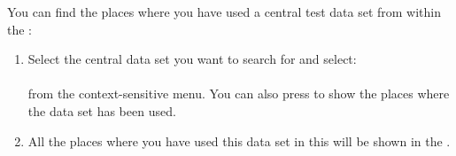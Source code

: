 You can find the places where you have used a central test data set from within the \gddataeditor{}:

\begin{enumerate}
\item Select the central data set you want to search for and select:\\
\\
from the context-sensitive menu. 
You can also press  to show the places where the data set has been used.
\item All the places where you have used this data set in this \gdproject{} will be shown in the  . 
\end{enumerate}
